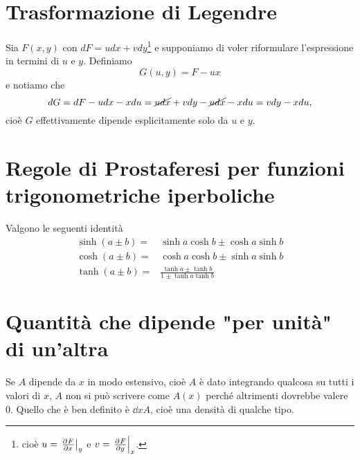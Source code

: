 \section{Trasformazione di Legendre}
Sia $F(x,y)$ con $dF=udx+vdy$\footnote{cio\`e $u=\ppb xFy$ e $v=\ppb yFx$.} e supponiamo di voler riformulare l'espressione in termini di $u$ e $y$. Definiamo 
\[G(u,y)=F-ux\]
e notiamo che
\[dG=dF-udx-xdu=\cancel{udx}+vdy-\cancel{udx}-xdu=vdy-xdu,\]
cio\`e $G$ effettivamente dipende esplicitamente solo da $u$ e $y$.


\section{Regole di Prostaferesi per funzioni trigonometriche iperboliche}\label{SommaTangenteIperbolica}
Valgono le seguenti identit\`a
\begin{align*}
\sinh(a\pm b)=&\sinh a\cosh b \pm \cosh a\sinh b\\
\cosh(a\pm b)=&\cosh a\cosh b\pm \sinh a\sinh b\\
\tanh(a\pm b)=&\frac{\tanh a\pm \tanh b}{1\pm \tanh a \tanh b}
\end{align*}


\section{Quantit\`a che dipende "per unit\`a" di un'altra}
\begin{remark}
Se $A$ dipende da $x$ in modo estensivo, cio\`e $A$ \`e dato integrando qualcosa su tutti i valori di $x$, $A$ non si pu\`o scrivere come $A(x)$ perch\'e altrimenti dovrebbe valere $0$. Quello che \`e ben definito \`e $\dd xA$, cio\`e una densit\`a di qualche tipo.
\end{remark}


